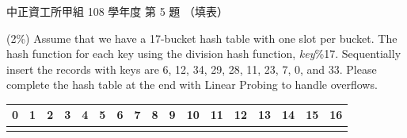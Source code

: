 \begin{pastexam}[label={px:ccu-108-swa-04}]{中正資工所甲組 108 學年度 第 5 題}
（填表）

(2\%) Assume that we have a 17-bucket hash table with one slot per bucket. The hash function for
each key using the division hash function, \textit{key}\%17. Sequentially insert the records with
keys are 6, 12, 34, 29, 28, 11, 23, 7, 0, and 33. Please complete the hash table at the end with
Linear Probing to handle overflows.

\begin{center}\small
\begin{tabular}{|*{17}{c|}}
\multicolumn{1}{c}{0} & \multicolumn{1}{c}{1} & \multicolumn{1}{c}{2} & \multicolumn{1}{c}{3} & \multicolumn{1}{c}{4} & \multicolumn{1}{c}{5} & \multicolumn{1}{c}{6} & \multicolumn{1}{c}{7} & \multicolumn{1}{c}{8} & \multicolumn{1}{c}{9} & \multicolumn{1}{c}{10} & \multicolumn{1}{c}{11} & \multicolumn{1}{c}{12} & \multicolumn{1}{c}{13} & \multicolumn{1}{c}{14} & \multicolumn{1}{c}{15} & \multicolumn{1}{c}{16}\\\hline
\phantom{00} & \phantom{00} & \phantom{00} & \phantom{00} & \phantom{00} & \phantom{00} & \phantom{00} & \phantom{00} & \phantom{00} & \phantom{00} & \phantom{00} & \phantom{00} & \phantom{00} & \phantom{00} & \phantom{00} & \phantom{00} & \phantom{00}\\\hline
\end{tabular}
\end{center}
\end{pastexam}

